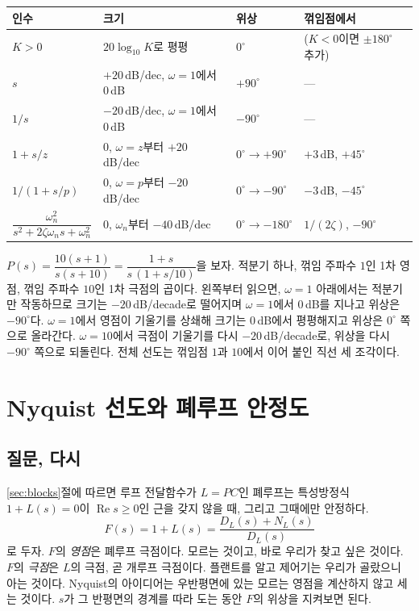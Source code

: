 \documentclass[11pt]{article}
\begin{document}
\begin{center}\small
\renewcommand{\arraystretch}{1.6}
\begin{tabular}{@{}llll@{}}
\toprule
인수 & 크기 & 위상 & 꺾임점에서\\
\midrule
$K>0$ & $20\log_{10}K$로 평평 & $0^\circ$ & ($K<0$이면 $\pm180^\circ$ 추가)\\
$s$ & $+20$\,dB/dec, $\omega=1$에서 $0$\,dB & $+90^\circ$ & ---\\
$1/s$ & $-20$\,dB/dec, $\omega=1$에서 $0$\,dB & $-90^\circ$ & ---\\
$1+s/z$ & $0$, $\omega=z$부터 $+20$\,dB/dec & $0^\circ\to+90^\circ$ & $+3$\,dB, $+45^\circ$\\
$1/(1+s/p)$ & $0$, $\omega=p$부터 $-20$\,dB/dec & $0^\circ\to-90^\circ$ & $-3$\,dB, $-45^\circ$\\
$\dfrac{\omega_n^{2}}{s^{2}+2\zeta\omega_n s+\omega_n^{2}}$ & $0$, $\omega_n$부터 $-40$\,dB/dec & $0^\circ\to-180^\circ$ & $1/(2\zeta)$, $-90^\circ$\\
\bottomrule
\end{tabular}
\end{center}

\begin{example}
$P(s)=\dfrac{10(s+1)}{s(s+10)}=\dfrac{1+s}{s\,(1+s/10)}$을 보자. 적분기 하나,
꺾임 주파수 $1$인 1차 영점, 꺾임 주파수 $10$인 1차 극점의 곱이다. 왼쪽부터
읽으면, $\omega=1$ 아래에서는 적분기만 작동하므로 크기는 $-20$\,dB/decade로
떨어지며 $\omega=1$에서 $0$\,dB를 지나고 위상은 $-90^\circ$다. $\omega=1$에서
영점이 기울기를 상쇄해 크기는 $0$\,dB에서 평평해지고 위상은 $0^\circ$ 쪽으로
올라간다. $\omega=10$에서 극점이 기울기를 다시 $-20$\,dB/decade로, 위상을 다시
$-90^\circ$ 쪽으로 되돌린다. 전체 선도는 꺾임점 $1$과 $10$에서 이어 붙인 직선
세 조각이다.
\end{example}

\section{Nyquist 선도와 폐루프 안정도}\label{sec:nyquist}

\subsection{질문, 다시}
\ref{sec:blocks}절에 따르면 루프 전달함수가 $L=PC$인 폐루프는 특성방정식
$1+L(s)=0$이 $\operatorname{Re}s\ge0$인 근을 갖지 않을 때, 그리고 그때에만
안정하다.
\[
   F(s) = 1+L(s) = \frac{D_L(s)+N_L(s)}{D_L(s)}
\]
로 두자. $F$의 \emph{영점}은 폐루프 극점이다. 모르는 것이고, 바로 우리가 찾고
싶은 것이다. $F$의 \emph{극점}은 $L$의 극점, 곧 개루프 극점이다. 플랜트를 알고
제어기는 우리가 골랐으니 아는 것이다. Nyquist의 아이디어는 우반평면에 있는 모르는
영점을 계산하지 않고 세는 것이다. $s$가 그 반평면의 경계를 따라 도는 동안 $F$의
위상을 지켜보면 된다.
\end{document}

